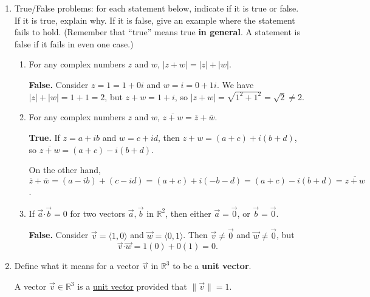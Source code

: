 \documentclass[12pt]{article}
\newcommand{\points}[1]{\marginpar{\hspace{24pt}[#1]}}
\newcommand{\R}{\mathbb{R}}
\newcommand{\dotp}{\boldsymbol{\cdot}}
\newcommand{\abs}[1]{\lvert #1\rvert}
\newcommand{\len}[1]{\lVert #1\rVert}
\begin{document}
\begin{enumerate}
 \item True/False problems: for each statement below, indicate if it is true or false. If it is true, explain why. If it is false, give an example where the statement fails to hold. (Remember that ``true'' means true \textbf{in general}. A statement is false if it fails in even one case.) 

 \begin{enumerate}
  \item For any complex numbers $z$ and $w$, $\abs{z+w} = \abs{z}+\abs{w}$. \points{3}

\bigskip

{\bf False.} Consider $z=1=1+0i$ and $w=i=0+1i$. We have $\abs{z}+\abs{w} = 1+1 = 2$, but $z+w=1+i$, so $\abs{z+w} = \sqrt{1^2+1^2}=\sqrt{2}\neq 2$.

\vspace{0.5in}

 \item For any complex numbers $z$ and $w$, $\overline{z+w} = \overline{z} + \overline{w}$. \points{3}

\bigskip

{\bf True.} If $z=a+ib$ and $w=c+id$, then $z+w=(a+c)+i(b+d)$, so $\overline{z+w} = (a+c)-i(b+d)$.

On the other hand, $\overline{z}+\overline{w} = (a-ib)+(c-id) = (a+c)+i(-b-d) = (a+c)-i(b+d) = \overline{z+w}$.

\vspace{0.5in}

 \item If $\vec{a}\dotp\vec{b}=0$ for two vectors $\vec{a},\vec{b}$ in $\R^2$, then either $\vec{a}=\vec{0}$, or $\vec{b}=\vec{0}$.\points{3}

\bigskip

{\bf False.} Consider $\vec{v} = \langle 1,0\rangle$ and $\vec{w} = \langle 0,1\rangle$. Then $\vec{v}\neq \vec{0}$ and $\vec{w}\neq \vec{0}$, but
\[
 \vec{v}\dotp\vec{w} = 1(0)+0(1) = 0.
\]

\vspace{0.5in}

 \end{enumerate}

 \item Define what it means for a vector $\vec{v}$ in $\R^3$ to be a \textbf{unit vector}.\points{3}

\bigskip

A vector $\vec{v}\in \R^3$ is a \underline{unit vector} provided that $\len{\vec{v}}=1$.
\newpage


\end{enumerate}
\end{document}
